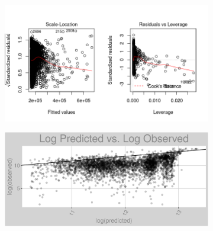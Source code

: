 \begin{figure}[h]
\centering
\begin{subfigure}{1\textwidth}
\centering
\includegraphics[width=.99\textwidth, height=0.425\textheight]{Images/natural_gas_psf_rf_res_2.png}
\end{subfigure}
\begin{subfigure}{1\textwidth}
\centering
\includegraphics[width=.99\textwidth, height=0.475\textheight]{Images/natural_gas_psf_rf_pvo.png}
\end{subfigure}
\end{figure}
\FloatBarrier
\newpage
